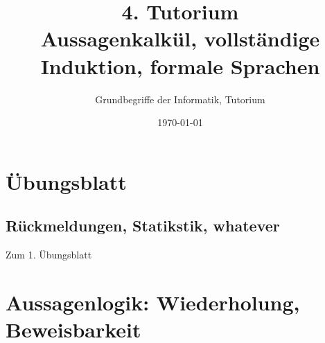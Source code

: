 




\title[Aussagenkalkül, vollständige Induktion, formale Sprachen]{4. Tutorium\\ Aussagenkalkül, vollständige Induktion, formale Sprachen}
\subtitle{Grundbegriffe der Informatik, Tutorium \hashtag\mytutnumber}
\date{\today}


\titleframe
\roadmap

\section*{Übungsblatt}
\subsection{Rückmeldungen, Statikstik, whatever}
	\begin{frame}{Zum 1. Übungsblatt}
	\end{frame}

\section[Aussagenlogik]{Aussagenlogik: Wiederholung, Beweisbarkeit}
